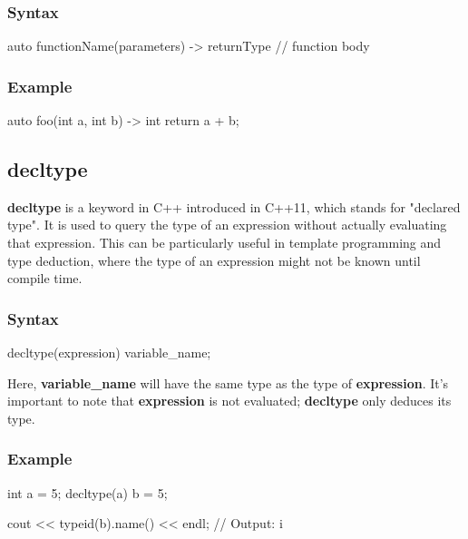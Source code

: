 \documentclass{report}
\begin{document}
    \subsubsection{Syntax}
    \bigbreak \noindent 
    \begin{cppcode}
    auto functionName(parameters) -> returnType {
        // function body
    }
    \end{cppcode}

    \bigbreak \noindent 
    \subsubsection{Example}
    \bigbreak \noindent 
    \begin{cppcode}
    auto foo(int a, int b) -> int {
        return a + b;
    }
    \end{cppcode}

    \bigbreak \noindent 
    \subsection{decltype}

    \bigbreak \noindent 
    \begin{concept}
        \textbf{decltype} is a keyword in C++ introduced in C++11, which stands for "declared type". It is used to query the type of an expression without actually evaluating that expression. This can be particularly useful in template programming and type deduction, where the type of an expression might not be known until compile time.
    \end{concept}
    \bigbreak \noindent 
    \subsubsection{Syntax}
    \bigbreak \noindent 
    \begin{cppcode}
        decltype(expression) variable_name;
    \end{cppcode}
    \bigbreak \noindent 
    Here, \textbf{variable\_name} will have the same type as the type of \textbf{expression}. It's important to note that \textbf{expression} is not evaluated; \textbf{decltype} only deduces its type.
    \bigbreak \noindent 
    \subsubsection{Example}
    \bigbreak \noindent 
    \begin{cppcode}
    int a = 5;
    decltype(a) b = 5;

    cout << typeid(b).name() << endl; // Output: i
    \end{cppcode}
\end{document}

